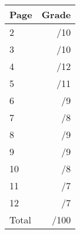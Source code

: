 \documentclass[12pt]{article}
\newcommand{\skipline}{\vspace{12pt}}
\begin{document}
\begin{table}[hbt]
\begin{center}
\begin{tabular}{|l|r|} \hline
Page&Grade\\
\hline \hline
\cline{1-2} 2 & \enspace\enspace\enspace\enspace\enspace\enspace/10\\
\cline{1-2} 3 & \enspace\enspace\enspace\enspace\enspace\enspace/10\\
\cline{1-2} 4 & \enspace\enspace\enspace\enspace\enspace\enspace/12\\
\cline{1-2} 5 & \enspace\enspace\enspace\enspace\enspace\enspace/11\\
\cline{1-2} 6 & \enspace\enspace\enspace\enspace\enspace\enspace/9\\
\cline{1-2} 7 & \enspace\enspace\enspace\enspace\enspace\enspace/8\\
\cline{1-2} 8 & \enspace\enspace\enspace\enspace\enspace\enspace/9\\
\cline{1-2} 9 & \enspace\enspace\enspace\enspace\enspace\enspace/9\\
\cline{1-2} 10 & \enspace\enspace\enspace\enspace\enspace\enspace/8\\
\cline{1-2} 11 & \enspace\enspace\enspace\enspace\enspace\enspace/7\\
\cline{1-2} 12 & \enspace\enspace\enspace\enspace\enspace\enspace/7\\
\cline{1-2} Total & \enspace\enspace\enspace\enspace\enspace\enspace/100\\
\hline
\end{tabular}

\skipline

\skipline

\skipline

\end{center}
\end{table}
\newpage
\end{document}
